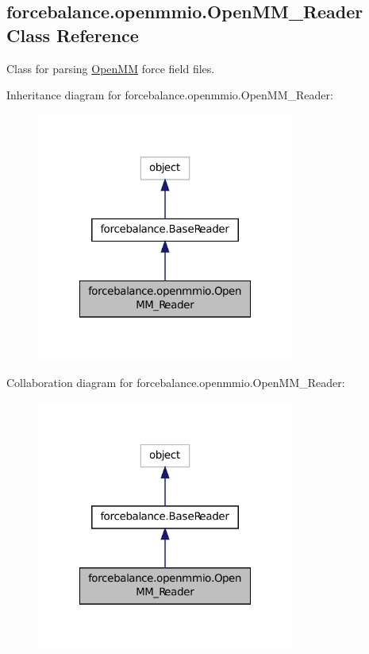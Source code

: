 \hypertarget{classforcebalance_1_1openmmio_1_1OpenMM__Reader}{\subsection{forcebalance.\-openmmio.\-Open\-M\-M\-\_\-\-Reader Class Reference}
\label{classforcebalance_1_1openmmio_1_1OpenMM__Reader}
}


Class for parsing \hyperlink{classforcebalance_1_1openmmio_1_1OpenMM}{Open\-M\-M} force field files.  




Inheritance diagram for forcebalance.\-openmmio.\-Open\-M\-M\-\_\-\-Reader\-:
\nopagebreak
\begin{figure}[H]
\begin{center}
\leavevmode
\includegraphics[width=240pt]{classforcebalance_1_1openmmio_1_1OpenMM__Reader__inherit__graph}
\end{center}
\end{figure}


Collaboration diagram for forcebalance.\-openmmio.\-Open\-M\-M\-\_\-\-Reader\-:
\nopagebreak
\begin{figure}[H]
\begin{center}
\leavevmode
\includegraphics[width=240pt]{classforcebalance_1_1openmmio_1_1OpenMM__Reader__coll__graph}
\end{center}
\end{figure}
